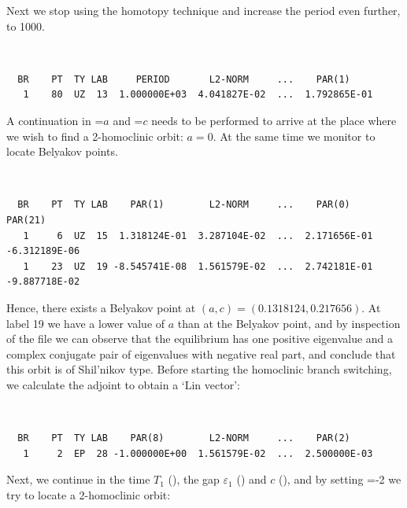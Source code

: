 Next we stop using the homotopy technique and increase the period even
further, to 1000.
\begin{center}
\\
\end{center}
\begin{verbatim}
  BR    PT  TY LAB     PERIOD       L2-NORM     ...    PAR(1)     
   1    80  UZ  13  1.000000E+03  4.041827E-02  ...  1.792865E-01
\end{verbatim}

A continuation in =$a$ and =$c$ needs to be 
performed to arrive
at the place where we wish to find a 2-homoclinic orbit: $a=0$. At the
same time we monitor  to locate Belyakov points.
\begin{center}
\\
\end{center}
\begin{verbatim}
  BR    PT  TY LAB    PAR(1)        L2-NORM     ...    PAR(0)        PAR(21)  
   1     6  UZ  15  1.318124E-01  3.287104E-02  ...  2.171656E-01 -6.312189E-06  
   1    23  UZ  19 -8.545741E-08  1.561579E-02  ...  2.742181E-01 -9.887718E-02
\end{verbatim}
Hence, there exists a Belyakov point at $(a,c)=(0.1318124,0.217656)$.
At label 19 we have a lower value of $a$ than at the Belyakov point,
and by inspection of the file
 we can observe that the equilibrium has one positive
eigenvalue and a complex conjugate pair of eigenvalues with negative
real part, and conclude that this orbit is of Shil'nikov type.
Before starting the homoclinic branch switching, we calculate
the adjoint to obtain a `Lin vector':
\begin{center}
\\
\end{center}
\begin{verbatim}
  BR    PT  TY LAB    PAR(8)        L2-NORM     ...    PAR(2)     
   1     2  EP  28 -1.000000E+00  1.561579E-02  ...  2.500000E-03
\end{verbatim}
Next, we continue in the time $T_1$ (), the gap
$\varepsilon_1$ () and $c$ (), 
and by setting =-2
we try to locate a 2-homoclinic orbit:
\begin{center}
\\
\end{center}
